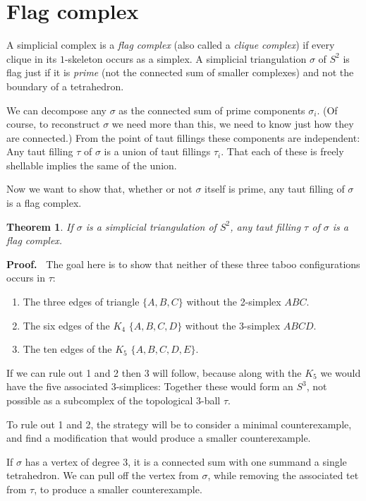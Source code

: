 \documentclass[12pt]{article}
\newtheorem{theorem}{Theorem}
\newcommand{\proofstart}{{\noindent \bf Proof.\ }}
\begin{document}
\section{Flag complex}

A simplicial complex is a \emph{flag complex} (also called a
\emph{clique complex}) if every clique in its $1$-skeleton occurs as a
simplex.
A simplicial triangulation $\sigma$ of $S^2$
is flag just if it is \emph{prime} 
(not the connected sum of smaller complexes)
and not the boundary of a tetrahedron.

We can decompose any $\sigma$ as the connected sum of
prime components $\sigma_i$.
(Of course, to reconstruct $\sigma$ we need more than this, we need to know
just how they are connected.)
From the point of taut fillings these components are independent:
Any taut filling $\tau$ of $\sigma$ is a union of taut fillings $\tau_i$.
That each of these is freely shellable implies the same of the union.

Now we want to show that, whether or not $\sigma$ itself is prime, 
any taut filling of $\sigma$ is a flag complex.

\begin{theorem}
If $\sigma$ is a simplicial triangulation of $S^2$,
any taut filling $\tau$ of $\sigma$ is a flag complex.
\end{theorem}

\proofstart
The goal here is to show that neither of these
three taboo configurations occurs
in $\tau$:
\begin{enumerate}
\item
The three edges of triangle $\{A,B,C\}$ without the 2-simplex $ABC$.
\item
The six edges of the $K_4$ $\{A,B,C,D\}$ without the 3-simplex $ABCD$.
\item
The ten edges of the $K_5$ $\{A,B,C,D,E\}$.
\end{enumerate}

If we can rule out 1 and 2 then 3 will follow, because
along with the $K_5$ we would have the five associated $3$-simplices:
Together these would form an $S^3$, not possible as a subcomplex
of the topological 3-ball $\tau$.

To rule out 1 and 2,
the strategy will be to consider a minimal counterexample,
and find a modification that would produce a smaller counterexample.

If $\sigma$ has a vertex of degree 3,
it is a connected sum with one summand a single tetrahedron.
We can pull off the vertex from $\sigma$, while removing the associated
tet from $\tau$, to produce a smaller counterexample.
\end{document}
